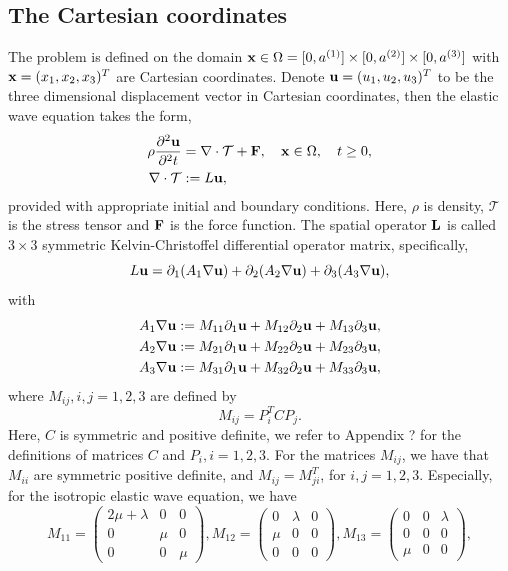 \documentclass[a4paper]{article}
\begin{document}
\subsection{The Cartesian coordinates}
The problem is defined on the domain ${\bf x}\in\Omega = [0,a^{(1)}]\times[0,a^{(2)}]\times[0,a^{(3)}]$ with ${\bf x} = (x_1,x_2,x_3)^T$ are Cartesian coordinates. Denote ${\bf u} = (u_1,u_2,u_3)^T$ to be the three dimensional displacement vector in Cartesian coordinates, then the elastic wave equation takes the form,
\begin{align*}
    \rho\frac{\partial^2{\bf u}}{\partial^2 t} &= \nabla\cdot\mathcal{T} + {\bf F}, \ \ \ {\bf x}\in\Omega,\ \ \ t\geq 0,\\
    \nabla\cdot\mathcal{T} &:= L{\bf u},
\end{align*}
provided with appropriate initial and boundary conditions. Here, $\rho$ is density, $\mathcal{T}$ is the stress tensor and ${\bf F}$ is the force function. The spatial operator ${\bf L}$ is called $3\times3$ symmetric Kelvin-Christoffel differential operator matrix, specifically,
\begin{equation*}
    L{\bf  u} = \partial_1(A_1\nabla{\bf u}) + \partial_2(A_2\nabla{\bf u}) + \partial_3(A_3\nabla{\bf u}),
\end{equation*}
with
\begin{align*}
A_1\nabla{\bf u} &:= M_{11}\partial_1{\bf u} + M_{12}\partial_2{\bf u} + M_{13}\partial_3{\bf u}, \\
A_2\nabla{\bf u} &:= M_{21}\partial_1{\bf u} + M_{22}\partial_2{\bf u} + M_{23}\partial_3{\bf u}, \\
A_3\nabla{\bf u} &:= M_{31}\partial_1{\bf u} + M_{32}\partial_2{\bf u} + M_{33}\partial_3{\bf u},
\end{align*}
where $M_{ij}, i,j = 1,2,3$ are defined by
\begin{equation}\label{Mmatrices}
M_{ij} = P^T_iCP_j.
\end{equation}
Here, $C$ is symmetric and positive definite, we refer to Appendix ? for the definitions of matrices $C$ and $P_i, i = 1,2,3$. For the matrices $M_{ij}$, we have that $M_{ii}$ are symmetric positive definite, and $M_{ij}=M^T_{ji}$, for $i,j=1,2,3$. Especially, for the isotropic elastic wave equation, we have
\[ M_{11} = \left(\begin{array}{ccc}
2\mu+\lambda & 0 & 0\\
0 & \mu & 0\\
0 & 0 & \mu\end{array}\right), M_{12} = \left(\begin{array}{ccc}
0 & \lambda & 0\\
\mu & 0 & 0\\
0 & 0 & 0\end{array}\right), M_{13} = \left(\begin{array}{ccc}
0 & 0 & \lambda\\
0 & 0 & 0\\
\mu & 0 & 0\end{array}\right),\]
\end{document}
